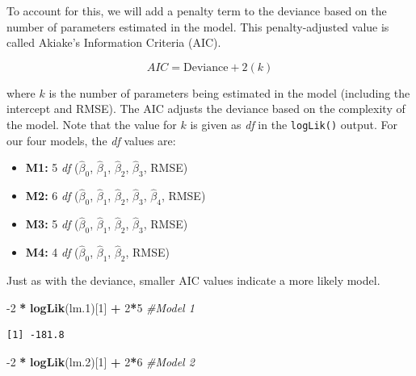 \documentclass[]{book}
\newenvironment{Shaded}{\begin{snugshade}}{\end{snugshade}}
\newcommand{\CommentTok}[1]{\textcolor[rgb]{0.56,0.35,0.01}{\textit{#1}}}
\newcommand{\DecValTok}[1]{\textcolor[rgb]{0.00,0.00,0.81}{#1}}
\newcommand{\FloatTok}[1]{\textcolor[rgb]{0.00,0.00,0.81}{#1}}
\newcommand{\KeywordTok}[1]{\textcolor[rgb]{0.13,0.29,0.53}{\textbf{#1}}}
\newcommand{\NormalTok}[1]{#1}
\newcommand{\OperatorTok}[1]{\textcolor[rgb]{0.81,0.36,0.00}{\textbf{#1}}}
\newcommand{\StringTok}[1]{\textcolor[rgb]{0.31,0.60,0.02}{#1}}
\providecommand{\tightlist}{%
  \setlength{\itemsep}{0pt}\setlength{\parskip}{0pt}}
\begin{document}
To account for this, we will add a penalty term to the deviance based on the number of parameters estimated in the model. This penalty-adjusted value is called Akiake's Information Criteria (AIC).

\[
AIC = \mathrm{Deviance} + 2(k)
\]

where \(k\) is the number of parameters being estimated in the model (including the intercept and RMSE). The AIC adjusts the deviance based on the complexity of the model. Note that the value for \(k\) is given as \emph{df} in the \texttt{logLik()} output. For our four models, the \emph{df} values are:

\begin{itemize}
\tightlist
\item
  \textbf{M1:} 5 \emph{df} (\(\hat\beta_0\), \(\hat\beta_1\), \(\hat\beta_2\), \(\hat\beta_3\), RMSE)
\item
  \textbf{M2:} 6 \emph{df} (\(\hat\beta_0\), \(\hat\beta_1\), \(\hat\beta_2\), \(\hat\beta_3\), \(\hat\beta_4\), RMSE)
\item
  \textbf{M3:} 5 \emph{df} (\(\hat\beta_0\), \(\hat\beta_1\), \(\hat\beta_2\), \(\hat\beta_3\), RMSE)
\item
  \textbf{M4:} 4 \emph{df} (\(\hat\beta_0\), \(\hat\beta_1\), \(\hat\beta_2\), RMSE)
\end{itemize}

Just as with the deviance, smaller AIC values indicate a more likely model.

\begin{Shaded}
\begin{Highlighting}[]
\DecValTok{-2} \OperatorTok{*}\StringTok{ }\KeywordTok{logLik}\NormalTok{(lm}\FloatTok{.1}\NormalTok{)[}\DecValTok{1}\NormalTok{] }\OperatorTok{+}\StringTok{ }\DecValTok{2}\OperatorTok{*}\DecValTok{5} \CommentTok{#Model 1}
\end{Highlighting}
\end{Shaded}

\begin{verbatim}
[1] -181.8
\end{verbatim}

\begin{Shaded}
\begin{Highlighting}[]
\DecValTok{-2} \OperatorTok{*}\StringTok{ }\KeywordTok{logLik}\NormalTok{(lm}\FloatTok{.2}\NormalTok{)[}\DecValTok{1}\NormalTok{] }\OperatorTok{+}\StringTok{ }\DecValTok{2}\OperatorTok{*}\DecValTok{6} \CommentTok{#Model 2}
\end{Highlighting}
\end{Shaded}
\end{document}
